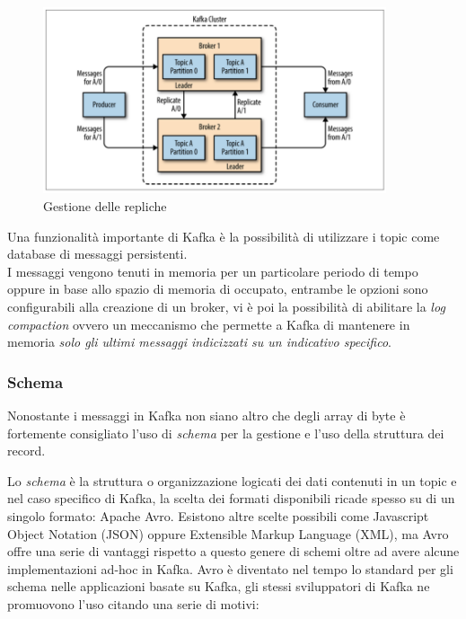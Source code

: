 \documentclass[]{article}
\begin{document}
\begin{figure}
\centering
\includegraphics[width=0.90000\textwidth]{../images/partition-replica.png}
\caption{Gestione delle repliche \label{figure_5}}
\end{figure}

\newpage

Una funzionalità importante di Kafka è la possibilità di utilizzare i
topic come database di messaggi persistenti.\\
I messaggi vengono tenuti in memoria per un particolare periodo di tempo
oppure in base allo spazio di memoria di occupato, entrambe le opzioni
sono configurabili alla creazione di un broker, vi è poi la possibilità
di abilitare la \emph{log compaction} ovvero un meccanismo che permette
a Kafka di mantenere in memoria \emph{solo gli ultimi messaggi
indicizzati su un indicativo specifico}.

\newpage

\subsubsection{Schema}\label{schema}

Nonostante i messaggi in Kafka non siano altro che degli array di byte è
fortemente consigliato l'uso di \emph{schema} per la gestione e l'uso
della struttura dei record.

Lo \emph{schema} è la struttura o organizzazione logicati dei dati
contenuti in un topic e nel caso specifico di Kafka, la scelta dei
formati disponibili ricade spesso su di un singolo formato: Apache Avro.
Esistono altre scelte possibili come Javascript Object Notation (JSON)
oppure Extensible Markup Language (XML), ma Avro offre una serie di
vantaggi rispetto a questo genere di schemi oltre ad avere alcune
implementazioni ad-hoc in Kafka. Avro è diventato nel tempo lo standard
per gli schema nelle applicazioni basate su Kafka, gli stessi
sviluppatori di Kafka ne promuovono l'uso citando una serie di motivi:
\end{document}
